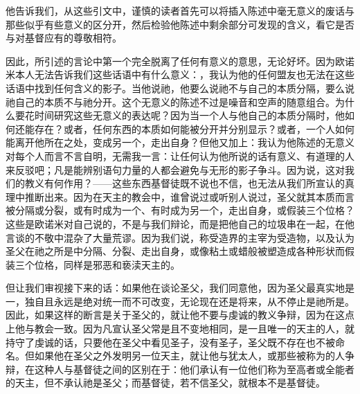 他告诉我们，从这些引文中，谨慎的读者首先可以将插入陈述中毫无意义的废话与那些似乎有些意义的区分开，然后检验他陈述中剩余部分可发现的含义，看它是否与对基督应有的尊敬相符。\par

因此，所引述的言论中第一个完全脱离了任何有意义的意思，无论好坏。因为欧诺米本人无法告诉我们这些话语中有什么意义：，我认为他的任何盟友也无法在这些话语中找到任何含义的影子。当他说祂，他要么说祂不与自己的本质分隔，要么说祂自己的本质不与祂分开。这个无意义的陈述不过是噪音和空声的随意组合。为什么要花时间研究这些无意义的表达呢？因为当一个人与他自己的本质分隔时，他如何还能存在？或者，任何东西的本质如何能被分开并分别显示？或者，一个人如何能离开他所在之处，变成另一个，走出自身？但他又加上：我认为他陈述的无意义对每个人而言不言自明，无需我一言：让任何认为他所说的话有意义、有道理的人来反驳吧；凡是能辨别语句力量的人都会避免与无形的影子争斗。因为说，这对我们的教义有何作用？——这些东西基督徒既不说也不信，也无法从我们所宣认的真理中推断出来。因为在天主的教会中，谁曾说过或听别人说过，圣父就其本质而言被分隔或分裂，或有时成为一个、有时成为另一个，走出自身，或假装三个位格？这些是欧诺米对自己说的，不是与我们辩论，而是把他自己的垃圾串在一起，在他言谈的不敬中混杂了大量荒谬。因为我们说，称受造界的主宰为受造物，以及认为圣父在祂之所是中分隔、分裂、走出自身，或像粘土或蜡般被塑造成各种形状而假装三个位格，同样是邪恶和亵渎天主的。\par

但让我们审视接下来的话：如果他在谈论圣父，我们同意他，因为圣父最真实地是一，独自且永远是绝对统一而不可改变，无论现在还是将来，从不停止是祂所是。因此，如果这样的断言是关于圣父的，就让他不要与虔诚的教义争辩，因为在这点上他与教会一致。因为凡宣认圣父常是且不变地相同，是一且唯一的天主的人，就持守了虔诚的话，只要他在圣父中看见圣子，没有圣子，圣父既不存在也不被命名。但如果他在圣父之外发明另一位天主，就让他与犹太人，或那些被称为的人争辩，在这种人与基督徒之间的区别在于：他们承认有一位他们称为至高者或全能者的天主，但不承认祂是圣父；而基督徒，若不信圣父，就根本不是基督徒。\par

